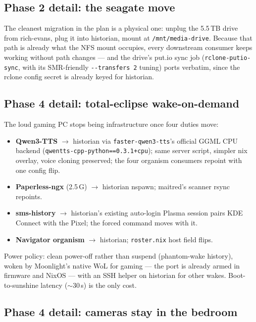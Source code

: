 \documentclass[11pt,letterpaper,headings=small]{scrartcl}
\begin{document}
\subsection{Phase 2 detail: the seagate move}

The cleanest migration in the plan is a physical one: unplug the 5.5\,TB
drive from rich-evans, plug it into historian, mount at
\texttt{/mnt/media-drive}. Because that path is already what the NFS
mount occupies, every downstream consumer keeps working without path
changes --- and the drive's put.io sync job (\texttt{rclone-putio-sync},
with its SMR-friendly \texttt{-{}-transfers 2} tuning) ports verbatim,
since the rclone config secret is already keyed for historian.

\subsection{Phase 4 detail: total-eclipse wake-on-demand}

The loud gaming PC stops being infrastructure once four duties move:
\begin{itemize}
  \item \textbf{Qwen3-TTS} $\rightarrow$ historian via
        \texttt{faster-qwen3-tts}'s official GGML CPU backend
        (\texttt{qwentts-cpp-python==0.3.1+cpu}); same server script,
        simpler nix overlay, voice cloning preserved; the four organism
        consumers repoint with one config flip.
  \item \textbf{Paperless-ngx} (2.5\,G) $\rightarrow$ historian
        nspawn; maitred's scanner rsync repoints.
  \item \textbf{sms-history} $\rightarrow$ historian's existing
        auto-login Plasma session pairs KDE Connect with the Pixel;
        the forced command moves with it.
  \item \textbf{Navigator organism} $\rightarrow$ historian;
        \texttt{roster.nix} host field flips.
\end{itemize}
Power policy: clean power-off rather than suspend (phantom-wake history),
woken by Moonlight's native WoL for gaming --- the port is already armed
in firmware and NixOS --- with an SSH helper on historian for other wakes.
Boot-to-sunshine latency ($\sim$30\,s) is the only cost.

\subsection{Phase 4 detail: cameras stay in the bedroom}
\end{document}
